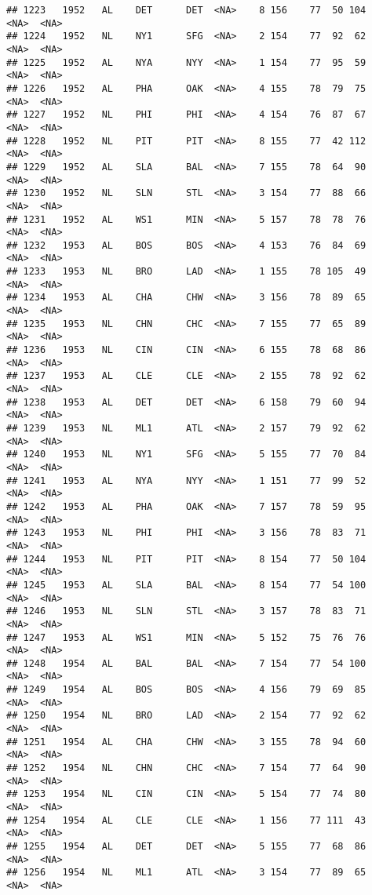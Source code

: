 \documentclass[]{article}
\begin{document}
\begin{verbatim}
## 1223   1952   AL    DET      DET  <NA>    8 156    77  50 104   <NA>  <NA>
## 1224   1952   NL    NY1      SFG  <NA>    2 154    77  92  62   <NA>  <NA>
## 1225   1952   AL    NYA      NYY  <NA>    1 154    77  95  59   <NA>  <NA>
## 1226   1952   AL    PHA      OAK  <NA>    4 155    78  79  75   <NA>  <NA>
## 1227   1952   NL    PHI      PHI  <NA>    4 154    76  87  67   <NA>  <NA>
## 1228   1952   NL    PIT      PIT  <NA>    8 155    77  42 112   <NA>  <NA>
## 1229   1952   AL    SLA      BAL  <NA>    7 155    78  64  90   <NA>  <NA>
## 1230   1952   NL    SLN      STL  <NA>    3 154    77  88  66   <NA>  <NA>
## 1231   1952   AL    WS1      MIN  <NA>    5 157    78  78  76   <NA>  <NA>
## 1232   1953   AL    BOS      BOS  <NA>    4 153    76  84  69   <NA>  <NA>
## 1233   1953   NL    BRO      LAD  <NA>    1 155    78 105  49   <NA>  <NA>
## 1234   1953   AL    CHA      CHW  <NA>    3 156    78  89  65   <NA>  <NA>
## 1235   1953   NL    CHN      CHC  <NA>    7 155    77  65  89   <NA>  <NA>
## 1236   1953   NL    CIN      CIN  <NA>    6 155    78  68  86   <NA>  <NA>
## 1237   1953   AL    CLE      CLE  <NA>    2 155    78  92  62   <NA>  <NA>
## 1238   1953   AL    DET      DET  <NA>    6 158    79  60  94   <NA>  <NA>
## 1239   1953   NL    ML1      ATL  <NA>    2 157    79  92  62   <NA>  <NA>
## 1240   1953   NL    NY1      SFG  <NA>    5 155    77  70  84   <NA>  <NA>
## 1241   1953   AL    NYA      NYY  <NA>    1 151    77  99  52   <NA>  <NA>
## 1242   1953   AL    PHA      OAK  <NA>    7 157    78  59  95   <NA>  <NA>
## 1243   1953   NL    PHI      PHI  <NA>    3 156    78  83  71   <NA>  <NA>
## 1244   1953   NL    PIT      PIT  <NA>    8 154    77  50 104   <NA>  <NA>
## 1245   1953   AL    SLA      BAL  <NA>    8 154    77  54 100   <NA>  <NA>
## 1246   1953   NL    SLN      STL  <NA>    3 157    78  83  71   <NA>  <NA>
## 1247   1953   AL    WS1      MIN  <NA>    5 152    75  76  76   <NA>  <NA>
## 1248   1954   AL    BAL      BAL  <NA>    7 154    77  54 100   <NA>  <NA>
## 1249   1954   AL    BOS      BOS  <NA>    4 156    79  69  85   <NA>  <NA>
## 1250   1954   NL    BRO      LAD  <NA>    2 154    77  92  62   <NA>  <NA>
## 1251   1954   AL    CHA      CHW  <NA>    3 155    78  94  60   <NA>  <NA>
## 1252   1954   NL    CHN      CHC  <NA>    7 154    77  64  90   <NA>  <NA>
## 1253   1954   NL    CIN      CIN  <NA>    5 154    77  74  80   <NA>  <NA>
## 1254   1954   AL    CLE      CLE  <NA>    1 156    77 111  43   <NA>  <NA>
## 1255   1954   AL    DET      DET  <NA>    5 155    77  68  86   <NA>  <NA>
## 1256   1954   NL    ML1      ATL  <NA>    3 154    77  89  65   <NA>  <NA>

\end{verbatim}
\end{document}
